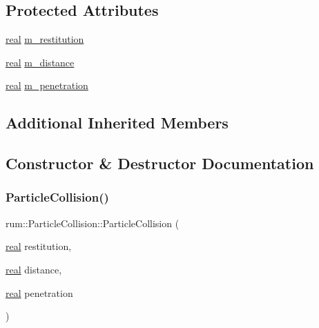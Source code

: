 \subsection*{Protected Attributes}
\begin{DoxyCompactItemize}
\item 
\hyperlink{namespacerum_a7e8cca23573d5eaead0f138cbaa4862c}{real} \hyperlink{classrum_1_1_particle_collision_ae7aca9af657f5aea5e5e8c1261a51569}{m\+\_\+restitution}
\item 
\hyperlink{namespacerum_a7e8cca23573d5eaead0f138cbaa4862c}{real} \hyperlink{classrum_1_1_particle_collision_ae3b3e58675e2312ed3fe6a53c5882cc6}{m\+\_\+distance}
\item 
\hyperlink{namespacerum_a7e8cca23573d5eaead0f138cbaa4862c}{real} \hyperlink{classrum_1_1_particle_collision_a9ad398fd1a7b78e8ae8083610be60abb}{m\+\_\+penetration}
\end{DoxyCompactItemize}
\subsection*{Additional Inherited Members}


\subsection{Constructor \& Destructor Documentation}
\mbox{\label{classrum_1_1_particle_collision_a56570896eab4c089fd3df8fa6e96454c}} 
\subsubsection{\texorpdfstring{Particle\+Collision()}{ParticleCollision()}}
{\footnotesize\ttfamily rum\+::\+Particle\+Collision\+::\+Particle\+Collision (\begin{DoxyParamCaption}\item[{\hyperlink{namespacerum_a7e8cca23573d5eaead0f138cbaa4862c}{real}}]{restitution,  }\item[{\hyperlink{namespacerum_a7e8cca23573d5eaead0f138cbaa4862c}{real}}]{distance,  }\item[{\hyperlink{namespacerum_a7e8cca23573d5eaead0f138cbaa4862c}{real}}]{penetration }\end{DoxyParamCaption})\hspace{0.3cm}{\ttfamily [explicit]}}

